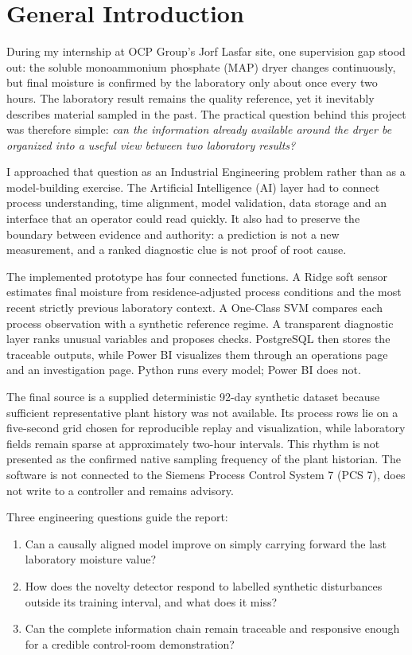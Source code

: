 \chapter*{General Introduction}

During my internship at OCP Group's Jorf Lasfar site, one supervision gap stood out: the soluble monoammonium phosphate (MAP) dryer changes continuously, but final moisture is confirmed by the laboratory only about once every two hours. The laboratory result remains the quality reference, yet it inevitably describes material sampled in the past. The practical question behind this project was therefore simple: \emph{can the information already available around the dryer be organized into a useful view between two laboratory results?}

I approached that question as an Industrial Engineering problem rather than as a model-building exercise. The Artificial Intelligence (AI) layer had to connect process understanding, time alignment, model validation, data storage and an interface that an operator could read quickly. It also had to preserve the boundary between evidence and authority: a prediction is not a new measurement, and a ranked diagnostic clue is not proof of root cause.

The implemented prototype has four connected functions. A Ridge soft sensor estimates final moisture from residence-adjusted process conditions and the most recent strictly previous laboratory context. A One-Class SVM compares each process observation with a synthetic reference regime. A transparent diagnostic layer ranks unusual variables and proposes checks. PostgreSQL then stores the traceable outputs, while Power BI visualizes them through an operations page and an investigation page. Python runs every model; Power BI does not.

The final source is a supplied deterministic 92-day synthetic dataset because sufficient representative plant history was not available. Its process rows lie on a five-second grid chosen for reproducible replay and visualization, while laboratory fields remain sparse at approximately two-hour intervals. This rhythm is not presented as the confirmed native sampling frequency of the plant historian. The software is not connected to the Siemens Process Control System 7 (PCS 7), does not write to a controller and remains advisory.

Three engineering questions guide the report:
\begin{enumerate}[label=\arabic*.]
\item Can a causally aligned model improve on simply carrying forward the last laboratory moisture value?
\item How does the novelty detector respond to labelled synthetic disturbances outside its training interval, and what does it miss?
\item Can the complete information chain remain traceable and responsive enough for a credible control-room demonstration?
\end{enumerate}

